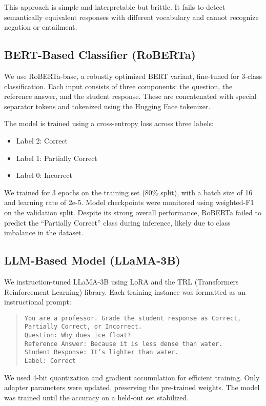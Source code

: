 \documentclass[11pt]{article}
\begin{document}
This approach is simple and interpretable but brittle. It fails to detect semantically equivalent responses with different vocabulary and cannot recognize negation or entailment.

\subsection{BERT-Based Classifier (RoBERTa)}
We use RoBERTa-base, a robustly optimized BERT variant, fine-tuned for 3-class classification. Each input consists of three components: the question, the reference answer, and the student response. These are concatenated with special separator tokens and tokenized using the Hugging Face tokenizer.

The model is trained using a cross-entropy loss across three labels:
\begin{itemize}
    \item Label 2: Correct
    \item Label 1: Partially Correct
    \item Label 0: Incorrect
\end{itemize}

We trained for 3 epochs on the training set (80\% split), with a batch size of 16 and learning rate of 2e-5. Model checkpoints were monitored using weighted-F1 on the validation split. Despite its strong overall performance, RoBERTa failed to predict the “Partially Correct” class during inference, likely due to class imbalance in the dataset.

\subsection{LLM-Based Model (LLaMA-3B)}
We instruction-tuned LLaMA-3B using LoRA and the TRL (Transformers Reinforcement Learning) library. Each training instance was formatted as an instructional prompt:

\begin{quote}
\texttt{You are a professor. Grade the student response as Correct, Partially Correct, or Incorrect.\\
Question: Why does ice float?\\
Reference Answer: Because it is less dense than water.\\
Student Response: It’s lighter than water.\\
Label: Correct}
\end{quote}

We used 4-bit quantization and gradient accumulation for efficient training. Only adapter parameters were updated, preserving the pre-trained weights. The model was trained until the accuracy on a held-out set stabilized.
\end{document}
